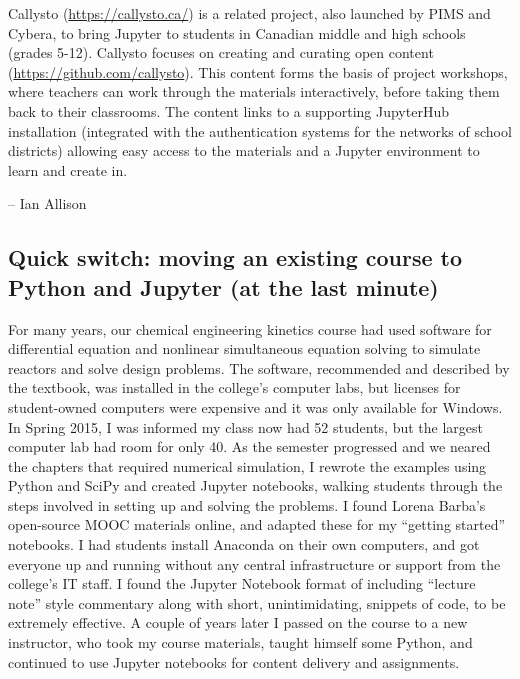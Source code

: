 \documentclass[]{book}
\begin{document}
Callysto (\url{https://callysto.ca/}) is a related project, also
launched by PIMS and Cybera, to bring Jupyter to students in Canadian
middle and high schools (grades 5-12). Callysto focuses on creating and
curating open content (\url{https://github.com/callysto}). This content
forms the basis of project workshops, where teachers can work through
the materials interactively, before taking them back to their
classrooms. The content links to a supporting JupyterHub installation
(integrated with the authentication systems for the networks of school
districts) allowing easy access to the materials and a Jupyter
environment to learn and create in.

-- Ian Allison

\subsection{Quick switch: moving an existing course to Python and
Jupyter (at the last
minute)}\label{quick-switch-moving-an-existing-course-to-python-and-jupyter-at-the-last-minute}

For many years, our chemical engineering kinetics course had used
software for differential equation and nonlinear simultaneous equation
solving to simulate reactors and solve design problems. The software,
recommended and described by the textbook, was installed in the
college's computer labs, but licenses for student-owned computers were
expensive and it was only available for Windows. In Spring 2015, I was
informed my class now had 52 students, but the largest computer lab had
room for only 40. As the semester progressed and we neared the chapters
that required numerical simulation, I rewrote the examples using Python
and SciPy and created Jupyter notebooks, walking students through the
steps involved in setting up and solving the problems. I found Lorena
Barba's open-source MOOC materials online, and adapted these for my
``getting started'' notebooks. I had students install Anaconda on their
own computers, and got everyone up and running without any central
infrastructure or support from the college's IT staff. I found the
Jupyter Notebook format of including ``lecture note'' style commentary
along with short, unintimidating, snippets of code, to be extremely
effective. A couple of years later I passed on the course to a new
instructor, who took my course materials, taught himself some Python,
and continued to use Jupyter notebooks for content delivery and
assignments.
\end{document}
